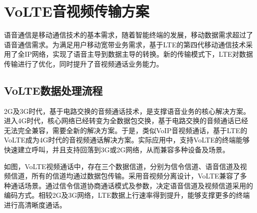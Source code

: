 \section{VoLTE音视频传输方案}
\label{chap:backinfo:volte}



语音通信是移动通信技术的基本需求，随着智能终端的发展，移动数据需求超过了语音通信需求。为满足用户移动宽带业务需求，基于LTE的第四代移动通信技术采用了全IP网络，实现了语音主导到数据主导的转换。新的传输模式下，LTE对数据传输进行了优化，同时提升了音视频通话业务能力。

\subsection{VoLTE数据处理流程}
\label{chap:backinfo:volte:datastream}

2G及3G时代，基于电路交换的音频通话技术，是支撑语音业务的核心解决方案。进入4G时代，核心网络已经转变为全数据包交换，基于电路交换的音频通话已经无法完全兼容，需要全新的解决方案。于是，类似VoIP音视频通话，基于LTE的VoLTE成为4G时代的音视频通话解决方案。实际应用中，支持VoLTE的终端能够快速建立呼叫，并且支持回落到3G或2G网络，从而兼容多种设备及场景。

如图，VoLTE视频通话中，存在三个数据信道，分别为信令信道、语音信道及视频信道，所有的信道均通过数据包传输。采用音视频分离设计，VoLTE兼容了多种通话场景。通过信令信道协商通话模式及参数，决定语音信道及视频信道采用的编码方式。相较2G及3G网络，LTE数据上行速率得到提升，能够支撑更多的终端进行高清晰度通话。

